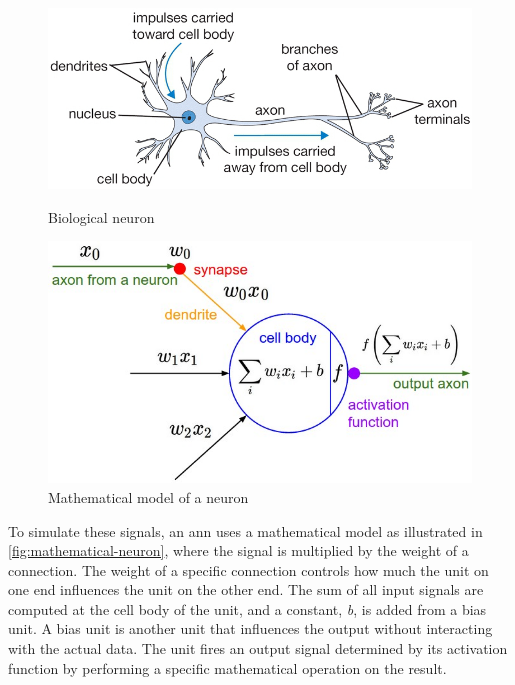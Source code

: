 \begin{figure}
    \begin{minipage}{0.5\textwidth}
        \centering
            \includegraphics[width=1\textwidth]{fig/neuron}
            \caption{Biological neuron \cite{cs231n-part1}}
            \label{fig:biological-neuron}
    \end{minipage}
    \begin{minipage}{0.4\textwidth}
        \centering
            \includegraphics[width=1\textwidth]{fig/neuron_model}
            \caption{Mathematical model of a neuron \cite{cs231n-part1}}
            \label{fig:mathematical-neuron}
    \end{minipage}
\end{figure}

\noindent To simulate these signals, an \acrshort{ann} uses a mathematical model as illustrated in \autoref{fig:mathematical-neuron}, where the signal is multiplied by the weight of a connection. The weight of a specific connection controls how much the unit on one end influences the unit on the other end. The sum of all input signals are computed at the cell body of the unit, and a constant, \textit{b}, is added from a bias unit. A bias unit is another unit that influences the output without interacting with the actual data. The unit fires an output signal determined by its activation function by performing a specific mathematical operation on the result.

